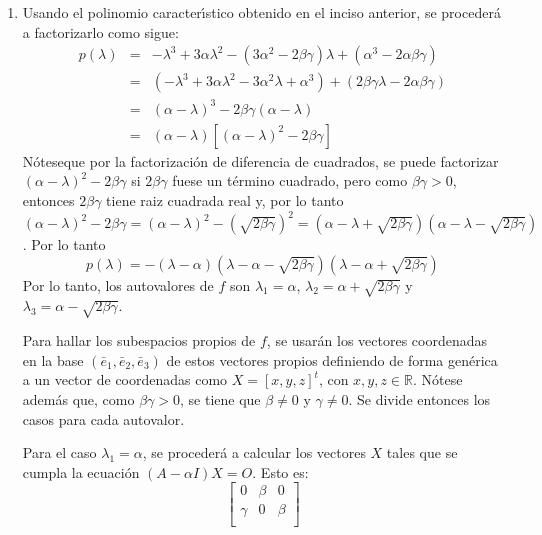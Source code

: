 \begin{solucion}
\begin{enumerate}[$a$)]
  \item Usando el polinomio caracter\'{\i}stico obtenido en el inciso anterior, se proceder\'a a factorizarlo como sigue:
  \begin{eqnarray*}
   p(\lambda) & = & 
   -\lambda^3 + 3\alpha\lambda^2 - (3\alpha^2 - 2\beta\gamma)\lambda + (\alpha^3 - 2\alpha\beta\gamma) \\ 
   & = & 
   \left( -\lambda^3 + 3\alpha\lambda^2 -3\alpha^2\lambda + \alpha^3 \right) + \left( 2\beta\gamma\lambda - 2\alpha\beta\gamma \right) \\
   & = & 
   (\alpha - \lambda)^3 - 2\beta\gamma(\alpha-\lambda) \\
   & = & 
   (\alpha - \lambda)\left[ (\alpha - \lambda)^2 - 2\beta\gamma \right]
  \end{eqnarray*}
  N\'oteseque por la factorizaci\'on de diferencia de cuadrados, se puede factorizar $(\alpha - \lambda)^2 - 2\beta\gamma$ si $2\beta\gamma$ fuese un t\'ermino cuadrado, pero como $\beta\gamma > 0$, entonces $2\beta\gamma$ tiene raiz cuadrada real y, por lo tanto $(\alpha - \lambda)^2 - 2\beta\gamma = (\alpha - \lambda)^2 - \left( \sqrt{2\beta\gamma} \right)^2 = \left( \alpha - \lambda + \sqrt{2\beta\gamma} \right) \left( \alpha - \lambda - \sqrt{2\beta\gamma} \right)$. Por lo tanto
  \begin{equation*}
   p(\lambda) = -(\lambda - \alpha)\left(\lambda - \alpha - \sqrt{2\beta\gamma }\right)\left( \lambda - \alpha + \sqrt{2\beta\gamma} \right)
  \end{equation*}
  Por lo tanto, los autovalores de $f$ son $\lambda_1 = \alpha$, $\lambda_2 = \alpha + \sqrt{2\beta\gamma}$ y $\lambda_3 = \alpha - \sqrt{2\beta\gamma}$.
  \par 
  Para hallar los subespacios propios de $f$, se usar\'an los vectores coordenadas en la base $(\bar{e}_1, \bar{e}_2, \bar{e}_3)$ de estos vectores propios definiendo de forma gen\'erica a un vector de coordenadas como $X = [x,y,z]^t$, con $x,y,z \in \mathbb{R}$. N\'otese adem\'as que, como $\beta\gamma > 0$, se tiene que $\beta \neq 0$ y $\gamma \neq 0$. Se divide entonces los casos para cada autovalor.
  \par 
  Para el caso $\lambda_1 = \alpha$, se proceder\'a a calcular los vectores $X$ tales que se cumpla la ecuaci\'on $(A - \alpha I)X = O$. Esto es:
  \begin{equation*}
   \begin{bmatrix}
    0 & \beta & 0 \\
    \gamma & 0 & \beta \\

\end{bmatrix}
\end{equation*}
\end{enumerate}
\end{solucion}
